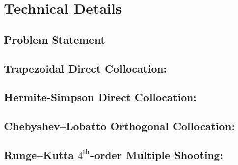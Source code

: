 \section{Technical Details}

\subsection{Problem Statement}


\subsection{Trapezoidal Direct Collocation:  }

\cite{Betts2010}

\subsection{Hermite-Simpson Direct Collocation:  }

\cite{Betts2010}

\subsection{Chebyshev--Lobatto Orthogonal Collocation:  }

\cite{Vlassenbroeck1988}

\subsection{Runge--Kutta $4^\text{th}$-order Multiple Shooting:  }


\cite{Betts2010}
